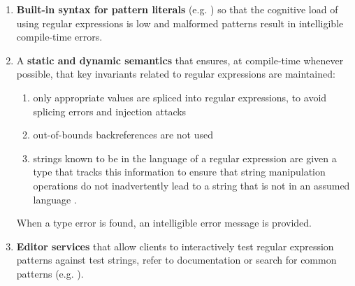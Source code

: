 \begin{enumerate}
\item \textbf{Built-in syntax for pattern literals} (e.g. \cite{perlre}) so that the cognitive load of using regular expressions is low and malformed patterns result in intelligible {compile-time} errors.
\item A \textbf{static and dynamic semantics} that ensures, at compile-time whenever possible, that key invariants related to regular expressions are maintained:
	\begin{enumerate}
	\item only appropriate values are spliced into regular expressions, to avoid splicing errors and injection attacks \cite{owasp2013}
	\item out-of-bounds backreferences are not used \cite{spishak2012type}
	\item strings known to be in the language of a regular expression are given a type that tracks this information to ensure that string manipulation operations do not inadvertently lead to a string that is not in an assumed language \cite{fulton-thesis}.
	\end{enumerate}
When a type error is found, an intelligible error message is provided.
\item \textbf{Editor services} that allow clients to interactively test regular expression patterns against test strings, refer to documentation or search for common patterns (e.g. \cite{IntelliJRegexp}).
\end{enumerate}

